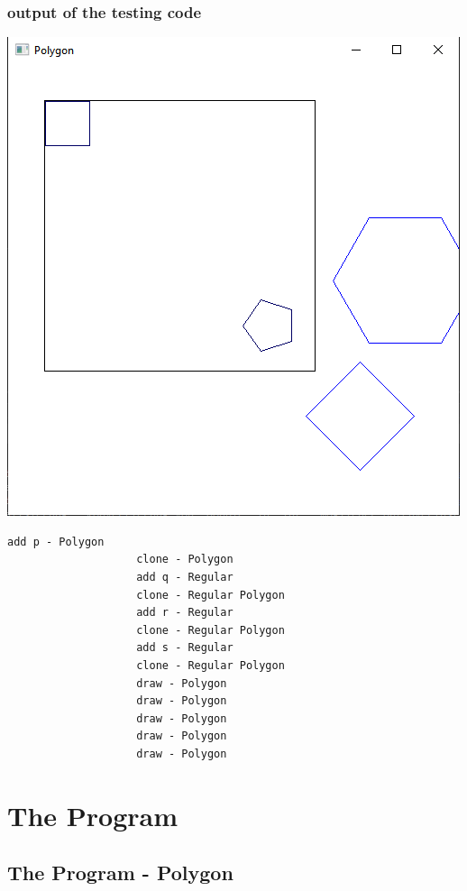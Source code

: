 \documentclass[11pt,titlepage]{article}
\begin{document}
				
		
			\subsubsection{output of the testing code}	
	
				\includegraphics[scale=0.5]{Documentation/Problems/problem.png}
				
				\begin{lstlisting}[numbers=none]
					add p - Polygon
					clone - Polygon
					add q - Regular
					clone - Regular Polygon
					add r - Regular
					clone - Regular Polygon
					add s - Regular
					clone - Regular Polygon
					draw - Polygon
					draw - Polygon
					draw - Polygon
					draw - Polygon
					draw - Polygon
				\end{lstlisting}
	
\newpage
	\section{The Program}
	

		\subsection{The Program - Polygon}
\end{document}
